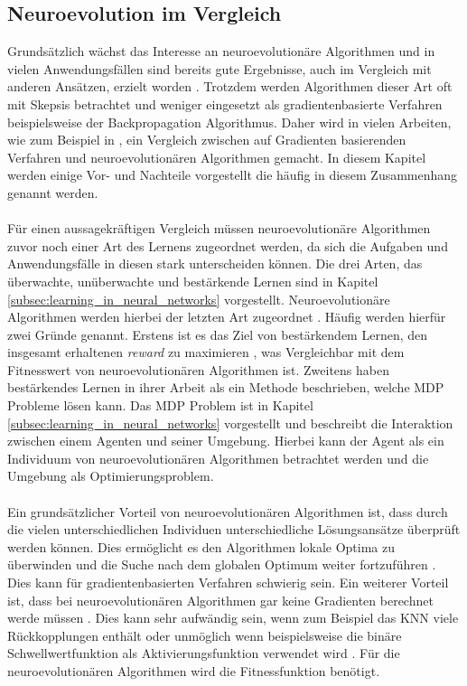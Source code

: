 
\subsection{Neuroevolution im Vergleich}
Grundsätzlich wächst das Interesse an neuroevolutionäre Algorithmen und in vielen Anwendungsfällen sind bereits gute Ergebnisse, auch im Vergleich mit anderen Ansätzen, erzielt worden \cite{meisner2009neurostrategies}. Trotzdem werden Algorithmen dieser Art oft mit Skepsis betrachtet \cite{meisner2009neurostrategies} und weniger eingesetzt als gradientenbasierte Verfahren beispielsweise der Backpropagation Algorithmus. Daher wird in vielen Arbeiten, wie zum Beispiel in \cite{rojas1996neural, meisner2009neurostrategies, such2017deep, whitley1993genetic}, ein Vergleich zwischen auf Gradienten basierenden Verfahren und neuroevolutionären Algorithmen gemacht. In diesem Kapitel werden einige Vor- und Nachteile vorgestellt die häufig in diesem Zusammenhang genannt werden.
\\\\
Für einen aussagekräftigen Vergleich müssen neuroevolutionäre Algorithmen zuvor noch einer Art des Lernens zugeordnet werden, da sich die Aufgaben und Anwendungsfälle in diesen stark unterscheiden können. Die drei Arten, das überwachte, unüberwachte und bestärkende Lernen sind in Kapitel \ref{subsec:learning_in_neural_networks} vorgestellt. Neuroevolutionäre Algorithmen werden hierbei der letzten Art zugeordnet \cite{whitley1993genetic}. Häufig werden hierfür zwei Gründe genannt. Erstens ist es das Ziel von bestärkendem Lernen, den insgesamt erhaltenen \emph{reward} zu maximieren \cite{such2017deep}, was Vergleichbar mit dem Fitnesswert von neuroevolutionären Algorithmen ist. Zweitens haben \citeauthor{sutton2018reinforcement} bestärkendes Lernen in ihrer Arbeit als ein Methode beschrieben, welche \ac{MDP} Probleme lösen kann. Das \ac{MDP} Problem ist in Kapitel \ref{subsec:learning_in_neural_networks} vorgestellt und beschreibt die Interaktion zwischen einem Agenten und seiner Umgebung. Hierbei kann der Agent als ein Individuum von neuroevolutionären Algorithmen betrachtet werden und die Umgebung als Optimierungsproblem. 
\\\\
Ein grundsätzlicher Vorteil von neuroevolutionären Algorithmen ist, dass durch die vielen unterschiedlichen Individuen unterschiedliche Lösungsansätze überprüft werden können. Dies ermöglicht es den Algorithmen lokale Optima zu überwinden und die Suche nach dem globalen Optimum weiter fortzuführen \cite{rojas1996neural}. Dies kann für gradientenbasierten Verfahren schwierig sein. Ein weiterer Vorteil ist, dass bei neuroevolutionären Algorithmen gar keine Gradienten berechnet werde müssen \cite{rojas1996neural}. Dies kann sehr aufwändig sein, wenn zum Beispiel das \ac{KNN} viele Rückkopplungen enthält oder unmöglich wenn beispielsweise die binäre Schwellwertfunktion als Aktivierungsfunktion verwendet wird \cite{whitley1993genetic}. Für die neuroevolutionären Algorithmen wird die Fitnessfunktion benötigt. 
